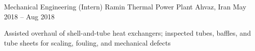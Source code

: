 \begin{cventries}

    \cventry
      {Mechanical Engineering (Intern)}
      {Ramin Thermal Power Plant}
      {Ahvaz, Iran}
      {May 2018 -- Aug 2018}
      {
        \begin{cvitems}
          \item {Assisted overhaul of shell-and-tube heat exchangers; inspected tubes, baffles, and tube sheets for scaling, fouling, and mechanical defects}
        \end{cvitems}
      }

  \end{cventries}